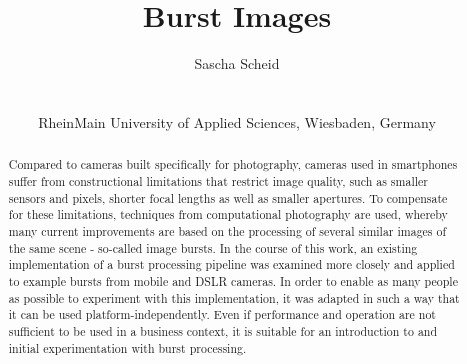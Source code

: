 \documentclass{egpubl}
\title[Burst Images]%
      {Burst Images}
\author[Sascha Scheid]
    {\parbox{\textwidth}
        {\centering 
			Sascha Scheid
        }
        \\
    {\parbox{\textwidth}
        {\centering RheinMain University of Applied Sciences, Wiesbaden, Germany\\
       }
    }
}
\begin{document}


\maketitle


\begin{abstract}
Compared to cameras built specifically for photography, cameras used in smartphones 
suffer from constructional limitations that restrict image quality, such as smaller 
sensors and pixels, shorter focal lengths as well as smaller apertures. To compensate for 
these limitations, techniques from computational photography are used, whereby many 
current improvements are based on the processing of several similar images of the same 
scene - so-called image bursts. In the course of this work, an existing implementation 
of a burst processing pipeline was examined more closely and applied to example bursts 
from mobile and DSLR cameras. In order to enable as many people as possible to 
experiment with this implementation, it was adapted in such a way that it can be 
used platform-independently. Even if performance and operation are not sufficient 
to be used in a business context, it is suitable for an introduction to and initial 
experimentation with burst processing.
\end{abstract}  
\end{document}
